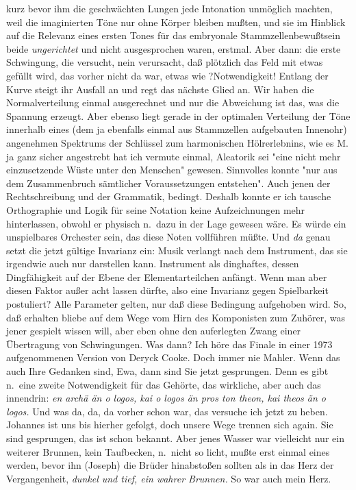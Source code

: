 \documentclass[
]{article}
\begin{document}
kurz bevor ihm die geschwächten Lungen jede Intonation unmöglich
machten, weil die imaginierten Töne nur ohne Körper bleiben mußten, und
sie im Hinblick auf die Relevanz eines ersten Tones für das embryonale
Stammzellenbewußtsein beide \emph{ungerichtet} und nicht ausgesprochen
waren, erstmal. Aber dann: die erste Schwingung, die versucht, nein
verursacht, daß plötzlich das Feld mit etwas gefüllt wird, das vorher
nicht da war, etwas wie ?Notwendigkeit! Entlang der Kurve steigt ihr
Ausfall an und regt das nächste Glied an. Wir haben die Normalverteilung
einmal ausgerechnet und nur die Abweichung ist das, was die Spannung
erzeugt. Aber ebenso liegt gerade in der optimalen Verteilung der Töne
innerhalb eines (dem ja ebenfalls einmal aus Stammzellen aufgebauten
Innenohr) angenehmen Spektrums der Schlüssel zum harmonischen
Hölrerlebnins, wie es M. ja ganz sicher angestrebt hat ich vermute
einmal, Aleatorik sei "eine nicht mehr einzusetzende Wüste unter den
Menschen" gewesen. Sinnvolles konnte "nur aus dem Zusammenbruch
sämtlicher Voraussetzungen entstehen". Auch jenen der Rechtschreibung
und der Grammatik, bedingt. Deshalb konnte er ich tausche Orthographie
und Logik für seine Notation keine Aufzeichnungen mehr hinterlassen,
obwohl er physisch n.~dazu in der Lage gewesen wäre. Es würde ein
unspielbares Orchester sein, das diese Noten vollführen müßte. Und
\emph{da} genau setzt die jetzt gültige Invarianz ein: Musik verlangt
nach dem Instrument, das sie irgendwie auch nur darstellen kann.
Instrument als dinghaftes, dessen Dingfähigkeit auf der Ebene der
Elementarteilchen anfängt. Wenn man aber diesen Faktor außer acht lassen
dürfte, also eine Invarianz gegen Spielbarkeit postuliert? Alle
Parameter gelten, nur daß diese Bedingung aufgehoben wird. So, daß
erhalten bliebe auf dem Wege vom Hirn des Komponisten zum Zuhörer, was
jener gespielt wissen will, aber eben ohne den auferlegten Zwang einer
Übertragung von Schwingungen. Was dann? Ich höre das Finale in einer
1973 aufgenommenen Version von Deryck Cooke. Doch immer nie Mahler. Wenn
das auch Ihre Gedanken sind, Ewa, dann sind Sie jetzt gesprungen. Denn
es gibt n.~eine zweite Notwendigkeit für das Gehörte, das wirkliche,
aber auch das innendrin: \emph{en archä än o logos, kai o logos än pros
ton theon, kai theos än o logos.} Und was da, da, da vorher schon war,
das versuche ich jetzt zu heben. Johannes ist uns bis hierher gefolgt,
doch unsere Wege trennen sich again. Sie sind gesprungen, das ist schon
bekannt. Aber jenes Wasser war vielleicht nur ein weiterer Brunnen, kein
Taufbecken, n.~nicht so licht, mußte erst einmal eines werden, bevor ihn
(Joseph) die Brüder hinabstoßen sollten als in das Herz der
Vergangenheit, \emph{dunkel und tief, ein wahrer Brunnen.} So war auch
mein Herz.
\end{document}
